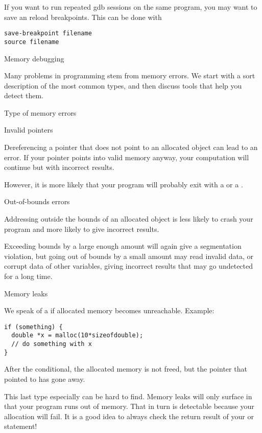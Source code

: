 If you want to run repeated gdb sessions on the same program,
you may want to save an reload breakpoints. This can be done with
\begin{verbatim}
save-breakpoint filename
source filename
\end{verbatim}


 {Memory debugging}

Many problems in programming stem from memory errors. We start with a
sort description of the most common types, and then discuss tools that
help you detect them.

 {Type of memory errors}

 {Invalid pointers}

Dereferencing a pointer that does not point to an allocated object can lead to an error.
If your pointer points into valid memory anyway, your computation will continue but with incorrect results.

However, it is more likely that
your program will probably exit with a
 or a .

 {Out-of-bounds errors}

Addressing outside the bounds of an allocated object is less likely to crash your program and more likely to give incorrect results.

Exceeding bounds by a large enough amount will again give a
segmentation violation, but going out of bounds by a small amount may
read invalid data, or corrupt data of other variables, giving
incorrect results that may go undetected for a long time.

 {Memory leaks}

We speak of a  if allocated memory becomes unreachable.
Example:
\begin{lstlisting}
if (something) {
  double *x = malloc(10*sizeofdouble);
  // do something with x
}
\end{lstlisting}
After the conditional, the allocated memory is not freed, but the
pointer that pointed to has gone away.

This last type especially can be hard to find.
Memory leaks will only surface in that your program runs out of
  memory. That in turn is detectable because your allocation will
  fail. It is a good idea to always check the return result of your
   or  statement!

